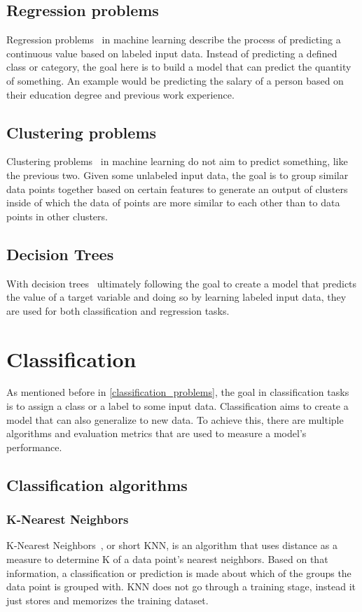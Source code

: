 \subsection{Regression problems}
Regression problems~\cite{classification_regression} in machine learning describe the process of predicting a continuous value based on labeled input data. Instead of predicting a defined class or category, the goal here is to build a model that can predict the quantity of something. An example would be predicting the salary of a person based on their education degree and previous work experience.

\subsection{Clustering problems}
Clustering problems~\cite{clustering} in machine learning do not aim to predict something, like the previous two. Given some unlabeled input data, the goal is to group similar data points together based on certain features to generate an output of clusters inside of which the data of points are more similar to each other than to data points in other clusters.

\subsection{Decision Trees}
With decision trees~\cite{decisiontrees} ultimately following the goal to create a model that predicts the value of a target variable and doing so by learning labeled input data, they are used for both classification and regression tasks.


\section{Classification} \label{classification}
As mentioned before in \ref{classification_problems}, the goal in classification tasks~\cite{classification_regression} is to assign a class or a label to some input data. Classification aims to create a model that can also generalize to new data. To achieve this, there are multiple algorithms and evaluation metrics that are used to measure a model's performance.

\subsection{Classification algorithms}

\subsubsection{K-Nearest Neighbors}
K-Nearest Neighbors~\cite{knn}, or short KNN, is an algorithm that uses distance as a measure to determine K of a data point's nearest neighbors. Based on that information, a classification or prediction is made about which of the groups the data point is grouped with. KNN does not go through a training stage, instead it just stores and memorizes the training dataset.

